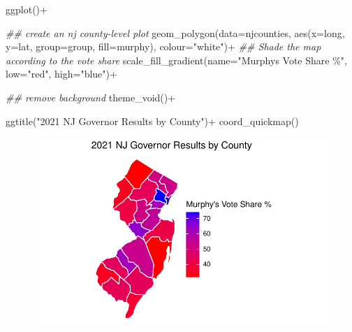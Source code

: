 \documentclass[
  letterpaper,
  DIV=11,
  numbers=noendperiod]{scrreprt}
\newenvironment{Shaded}{\begin{snugshade}}{\end{snugshade}}
\newcommand{\AttributeTok}[1]{\textcolor[rgb]{0.40,0.45,0.13}{#1}}
\newcommand{\DocumentationTok}[1]{\textcolor[rgb]{0.37,0.37,0.37}{\textit{#1}}}
\newcommand{\FunctionTok}[1]{\textcolor[rgb]{0.28,0.35,0.67}{#1}}
\newcommand{\NormalTok}[1]{\textcolor[rgb]{0.00,0.23,0.31}{#1}}
\newcommand{\SpecialCharTok}[1]{\textcolor[rgb]{0.37,0.37,0.37}{#1}}
\newcommand{\StringTok}[1]{\textcolor[rgb]{0.13,0.47,0.30}{#1}}
\begin{document}
\begin{Shaded}
\begin{Highlighting}[]
\FunctionTok{ggplot}\NormalTok{()}\SpecialCharTok{+}
  
  \DocumentationTok{\#\# create an nj county{-}level plot}
  \FunctionTok{geom\_polygon}\NormalTok{(}\AttributeTok{data=}\NormalTok{njcounties, }\FunctionTok{aes}\NormalTok{(}\AttributeTok{x=}\NormalTok{long, }\AttributeTok{y=}\NormalTok{lat, }
                                    \AttributeTok{group=}\NormalTok{group, }
                                    \AttributeTok{fill=}\NormalTok{murphy),}
               \AttributeTok{colour=}\StringTok{"white"}\NormalTok{)}\SpecialCharTok{+}
  \DocumentationTok{\#\# Shade the map according to the vote share}
  \FunctionTok{scale\_fill\_gradient}\NormalTok{(}\AttributeTok{name=}\StringTok{"Murphy\textquotesingle{}s Vote Share \%"}\NormalTok{, }\AttributeTok{low=}\StringTok{"red"}\NormalTok{, }\AttributeTok{high=}\StringTok{"blue"}\NormalTok{)}\SpecialCharTok{+}
  
  \DocumentationTok{\#\# remove background}
  \FunctionTok{theme\_void}\NormalTok{()}\SpecialCharTok{+}
  
  \FunctionTok{ggtitle}\NormalTok{(}\StringTok{"2021 NJ Governor Results by County"}\NormalTok{)}\SpecialCharTok{+}
  \FunctionTok{coord\_quickmap}\NormalTok{()}
\end{Highlighting}
\end{Shaded}

\begin{figure}[H]

{\centering \includegraphics{12-Maps_files/figure-pdf/unnamed-chunk-17-1.pdf}

}

\end{figure}
\end{document}
